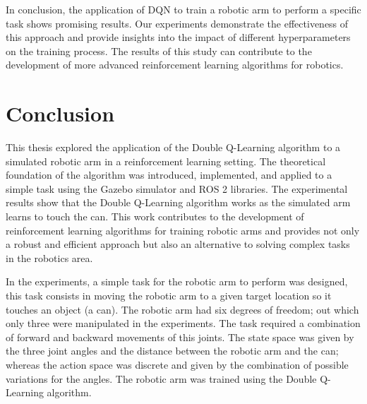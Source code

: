\documentclass[12pt,oneside]{article}
\begin{document}
In conclusion, the application of DQN to train a robotic arm to perform a specific task shows promising results. Our experiments demonstrate the effectiveness of this approach and provide insights into the impact of different hyperparameters on the training process. The results of this study can contribute to the development of more advanced reinforcement learning algorithms for robotics.


%
\section{Conclusion}
This thesis explored the application of the Double Q-Learning algorithm to a simulated robotic arm in a reinforcement learning setting. The theoretical foundation of the algorithm was introduced, implemented, and applied to a simple task using the Gazebo simulator and ROS 2 libraries. The experimental results show that the Double Q-Learning algorithm works as the simulated arm learns to touch the can. This work contributes to the development of reinforcement learning algorithms for training robotic arms and provides not only a robust and efficient approach but also an alternative to solving complex tasks in the robotics area.

In the experiments, a simple task for the robotic arm to perform was designed, this task consists in moving the robotic arm to a given target location so it touches an object (a can). The robotic arm had six degrees of freedom; out which only three were manipulated in the experiments. The task required a combination of forward and backward movements of this joints. The state space was given by the three joint angles and the distance between the robotic arm and the can; whereas the action space was discrete and given by the combination of possible variations for the angles. The robotic arm was trained using the Double Q-Learning algorithm.
\end{document}
